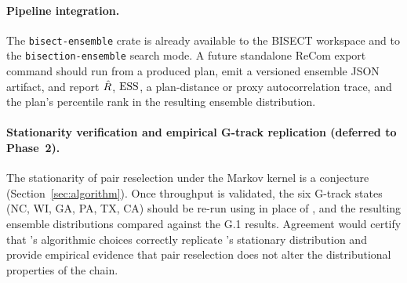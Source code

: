 \paragraph{Pipeline integration.}
The \texttt{bisect-ensemble} crate is already available to the BISECT
workspace and to the \texttt{bisection-ensemble} search mode. A future
standalone ReCom export command should run from a produced plan, emit a
versioned ensemble JSON artifact, and report $\hat{R}$, $\mathrm{ESS}$, a plan-distance
or proxy autocorrelation trace, and the plan's percentile rank in the
resulting ensemble distribution.

\paragraph{Stationarity verification and empirical G-track replication (deferred to Phase~2).}
The stationarity of pair reselection under the \re{} Markov kernel
is a conjecture (Section~\ref{sec:algorithm}).
Once throughput is validated, the six G-track states (NC, WI, GA, PA,
TX, CA) should be re-run using \re{} in place of \gc{}, and the
resulting ensemble distributions compared against the G.1 results.
Agreement would certify that \re{}'s algorithmic choices correctly
replicate \gc{}'s stationary distribution and provide empirical
evidence that pair reselection does not alter the distributional
properties of the chain.
